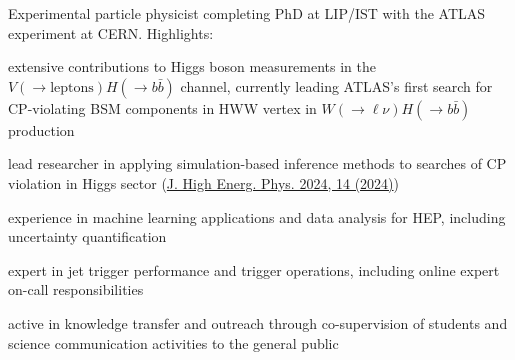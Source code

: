 
Experimental particle physicist completing PhD at LIP/IST with the ATLAS experiment at CERN. Highlights:

\begin{cvitems}
    \item[]\vspace{-0.5\baselineskip}
    \item extensive contributions to Higgs boson measurements in the $V(\to \textrm{leptons}) H(\to b\bar{b})$ channel, currently leading ATLAS's first search for CP-violating BSM components in HWW vertex in $W(\to \ell \nu) H(\to b\bar{b})$ production
    \item lead researcher in applying simulation-based inference methods to searches of CP violation in Higgs sector (\href{https://doi.org/10.1007/JHEP04(2024)014}{J. High Energ. Phys. 2024, 14 (2024)})
    \item experience in machine learning applications and data analysis for HEP, including uncertainty quantification
    \item expert in jet trigger performance and trigger operations, including online expert on-call responsibilities
    \item active in knowledge transfer and outreach through co-supervision of students and science communication activities to the general public
    \item[]\vspace{-0.5\baselineskip}
\end{cvitems}
